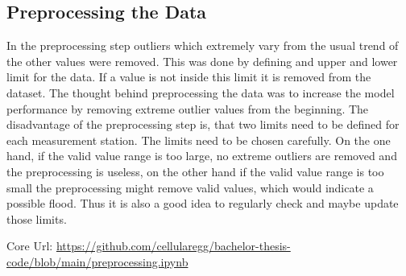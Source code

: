 \subsection{Preprocessing the Data}\label{subsection:data-preprocessing}
In the preprocessing step outliers which extremely vary from the usual trend of the other values were removed. This was done by defining and upper and lower limit for the data. If a value is not inside this limit it is removed from the dataset. The thought behind preprocessing the data was to increase the model performance by removing extreme outlier values from the beginning. The disadvantage of the preprocessing step is, that two limits need to be defined for each measurement station. The limits need to be chosen carefully. On the one hand, if the valid value range is too large, no extreme outliers are removed and the preprocessing is useless, on the other hand if the valid value range is too small the preprocessing might remove valid values, which would indicate a possible flood. Thus it is also a good idea to regularly check and maybe update those limits.
\par
Core Url: \url{https://github.com/cellularegg/bachelor-thesis-code/blob/main/preprocessing.ipynb}

